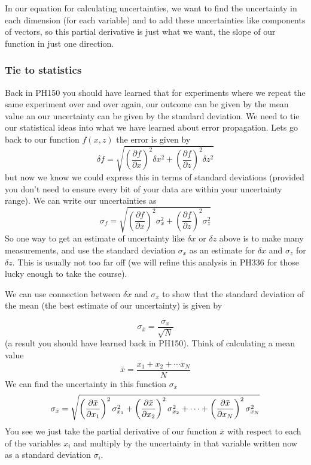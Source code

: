In our equation for calculating uncertainties, we want to find the
uncertainty in each dimension (for each variable) and to add these
uncertainties like components of vectors, so this partial derivative is just
what we want, the slope of our function in just one direction.

\subsubsection{Tie to statistics}

Back in PH150 you should have learned that for experiments where we repeat
the same experiment over and over again, our outcome can be given by the
mean value an our uncertainty can be given by the standard deviation. We
need to tie our statistical ideas into what we have learned about error
propagation. Lets go back to our function $f\left( x,z\right) $ the error is
given by 
\begin{equation*}
\delta f=\sqrt{\left( \frac{\partial f}{\partial x}\right) ^{2}\delta
x^{2}+\left( \frac{\partial f}{\partial z}\right) ^{2}\delta z^{2}}
\end{equation*}%
but now we know we could express this in terms of standard deviations
(provided you don't need to ensure every bit of your data are within your
uncertainty range). We can write our uncertainties as 
\begin{equation*}
\sigma _{f}=\sqrt{\left( \frac{\partial f}{\partial x}\right) ^{2}\sigma
_{x}^{2}+\left( \frac{\partial f}{\partial z}\right) ^{2}\sigma _{z}^{2}}
\end{equation*}%
So one way to get an estimate of uncertainty like $\delta x$ or $\delta z$
above is to make many measurements, and use the standard deviation $\sigma
_{x}$ as an estimate for $\delta x$ and $\sigma _{z}$ for $\delta z.$ This
is usually not too far off (we will refine this analysis in PH336 for those
lucky enough to take the course).

We can use connection between $\delta x$ and $\sigma _{x}$ to show that the
standard deviation of the mean (the best estimate of our uncertainty) is
given by

\begin{equation*}
\sigma _{\bar{x}}=\frac{\sigma _{x}}{\sqrt{N}}
\end{equation*}%
(a result you should have learned back in PH150). Think of calculating a
mean value%
\begin{equation*}
\bar{x}=\frac{x_{1}+x_{2}+\cdots x_{N}}{N}
\end{equation*}%
We can find the uncertainty in this function $\sigma _{\bar{x}}$%
\begin{equation*}
\sigma _{\bar{x}}=\sqrt{\left( \frac{\partial \bar{x}}{\partial x_{1}}%
\right) ^{2}\sigma _{x_{1}}^{2}+\left( \frac{\partial \bar{x}}{\partial x_{2}%
}\right) ^{2}\sigma _{x_{2}}^{2}+\cdots +\left( \frac{\partial \bar{x}}{%
\partial x_{N}}\right) ^{2}\sigma _{x_{N}}^{2}}
\end{equation*}%
You see we just take the partial derivative of our function $\bar{x}$ with
respect to each of the variables $x_{i}$ and multiply by the uncertainty in
that variable written now as a standard deviation $\sigma _{i}.$


